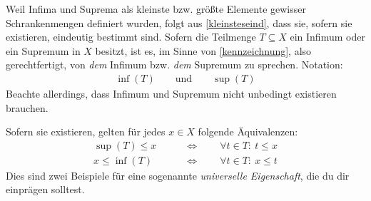 \begin{nota}
    Weil Infima und Suprema als kleinste bzw. größte Elemente gewisser Schrankenmengen definiert wurden, folgt aus \cref{kleinsteseind}, dass sie, sofern sie existieren, eindeutig bestimmt sind. Sofern die Teilmenge $T\subseteq X$ ein Infimum oder ein Supremum in $X$ besitzt, ist es, im Sinne von \cref{kennzeichnung}, also gerechtfertigt, von \emph{dem} Infimum bzw. \emph{dem} Supremum zu sprechen. Notation:
    \begin{align*}
        \inf(T) \qquad\text{und}\qquad \sup(T)
    \end{align*}
    Beachte allerdings, dass Infimum und Supremum nicht unbedingt existieren brauchen.

    Sofern sie existieren, gelten für jedes $x\in X$ folgende Äquivalenzen:
    \begin{align*}
        \sup(T)\le x \qquad&\Leftrightarrow\qquad \forall t\in T:\ t\le x \\
        x\le \inf(T) \qquad&\Leftrightarrow\qquad \forall t\in T:\ x\le t
    \end{align*}
    Dies sind zwei Beispiele für eine sogenannte \emph{universelle Eigenschaft}, die du dir einprägen solltest.
\end{nota}


